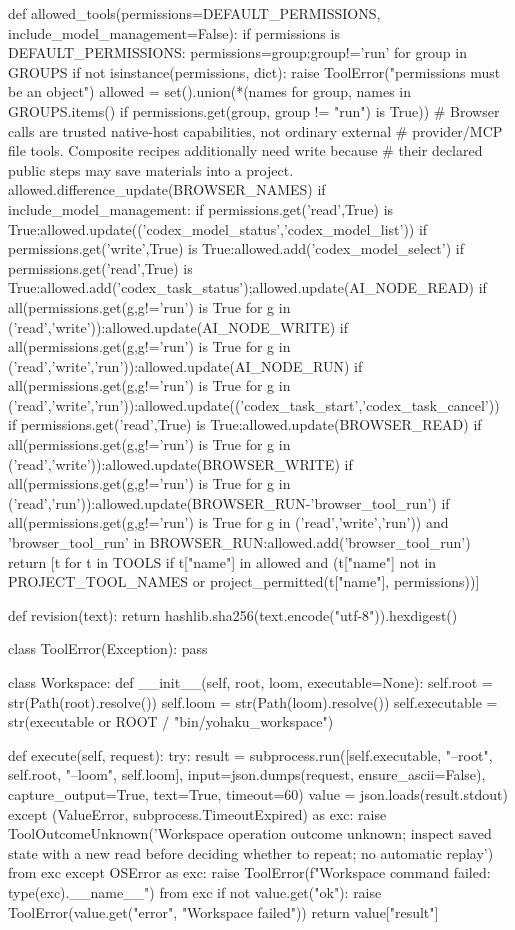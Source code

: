 def allowed_tools(permissions=DEFAULT_PERMISSIONS, include_model_management=False):
    if permissions is DEFAULT_PERMISSIONS:
        permissions={group:group!='run' for group in GROUPS}
    if not isinstance(permissions, dict):
        raise ToolError("permissions must be an object")
    allowed = set().union(*(names for group, names in GROUPS.items() if permissions.get(group, group != "run") is True))
    # Browser calls are trusted native-host capabilities, not ordinary external
    # provider/MCP file tools. Composite recipes additionally need write because
    # their declared public steps may save materials into a project.
    allowed.difference_update(BROWSER_NAMES)
    if include_model_management:
        if permissions.get('read',True) is True:allowed.update(('codex_model_status','codex_model_list'))
        if permissions.get('write',True) is True:allowed.add('codex_model_select')
        if permissions.get('read',True) is True:allowed.add('codex_task_status');allowed.update(AI_NODE_READ)
        if all(permissions.get(g,g!='run') is True for g in ('read','write')):allowed.update(AI_NODE_WRITE)
        if all(permissions.get(g,g!='run') is True for g in ('read','write','run')):allowed.update(AI_NODE_RUN)
        if all(permissions.get(g,g!='run') is True for g in ('read','write','run')):allowed.update(('codex_task_start','codex_task_cancel'))
        if permissions.get('read',True) is True:allowed.update(BROWSER_READ)
        if all(permissions.get(g,g!='run') is True for g in ('read','write')):allowed.update(BROWSER_WRITE)
        if all(permissions.get(g,g!='run') is True for g in ('read','run')):allowed.update(BROWSER_RUN-{'browser_tool_run'})
        if all(permissions.get(g,g!='run') is True for g in ('read','write','run')) and 'browser_tool_run' in BROWSER_RUN:allowed.add('browser_tool_run')
    return [t for t in TOOLS if t["name"] in allowed and (t["name"] not in PROJECT_TOOL_NAMES or project_permitted(t["name"], permissions))]


def revision(text):
    return hashlib.sha256(text.encode("utf-8")).hexdigest()

class ToolError(Exception):
    pass

class Workspace:
    def __init__(self, root, loom, executable=None):
        self.root = str(Path(root).resolve())
        self.loom = str(Path(loom).resolve())
        self.executable = str(executable or ROOT / "bin/yohaku_workspace")

    def execute(self, request):
        try:
            result = subprocess.run([self.executable, "--root", self.root, "--loom", self.loom],
                input=json.dumps(request, ensure_ascii=False), capture_output=True, text=True, timeout=60)
            value = json.loads(result.stdout)
        except (ValueError, subprocess.TimeoutExpired) as exc:
            raise ToolOutcomeUnknown('Workspace operation outcome unknown; inspect saved state with a new read before deciding whether to repeat; no automatic replay') from exc
        except OSError as exc:
            raise ToolError(f"Workspace command failed: {type(exc).__name__}") from exc
        if not value.get("ok"):
            raise ToolError(value.get("error", "Workspace failed"))
        return value["result"]

